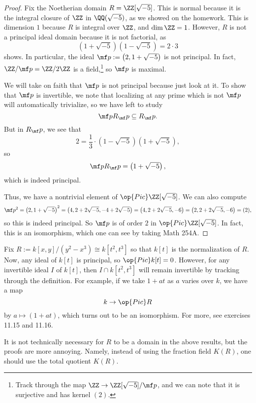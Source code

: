\begin{proof}
	Fix the Noetherian domain $R=\ZZ[\sqrt{-5}]$. This is normal because it is the integral closure of $\ZZ$ in $\QQ(\sqrt{-5})$, as we showed on the homework. This is dimension $1$ because $R$ is integral over $\ZZ$, and $\dim\ZZ=1$. However, $R$ is not a principal ideal domain because it is not factorial, as
	\[\left(1+\sqrt{-5}\right)\left(1-\sqrt{-5}\right)=2\cdot3\]
	shows. In particular, the ideal $\mf p:=\left(2,1+\sqrt{-5}\right)$ is not principal. In fact, $\ZZ/\mf p=\ZZ/2\ZZ$ is a field,\footnote{Track through the map $\ZZ\to\ZZ[\sqrt{-5}]/\mf p$, and we can note that it is surjective and has kernel $(2)$.} so $\mf p$ is maximal.

	We will take on faith that $\mf p$ is not principal because just look at it. To show that $\mf p$ is invertible, we note that localizing at any prime which is not $\mf p$ will automatically trivialize, so we have left to study
	\[\mf pR_\mf p\subseteq R_\mf p.\]
	But in $R_\mf p$, we see that
	\[2=\frac13\cdot\left(1-\sqrt{-5}\right)\left(1+\sqrt{-5}\right),\]
	so
	\[\mf pR_\mf p=\left(1+\sqrt{-5}\right),\]
	which is indeed principal.

	Thus, we have a nontrivial element of $\op{Pic}\ZZ[\sqrt{-5}]$. We can also compute
	\[\mf p^2=\left(2,1+\sqrt{-5}\right)^2=\left(4,2+2\sqrt{-5},-4+2\sqrt{-5}\right)=\left(4,2+2\sqrt{-5},-6\right)=\left(2,2+2\sqrt{-5},-6\right)=(2),\]
	so this is indeed principal. So $\mf p$ is of order $2$ in $\op{Pic}\ZZ[\sqrt{-5}]$. In fact, this is an isomorphism, which one can see by taking Math 254A.
\end{proof}
\begin{ex}
	Fix $R:=k[x,y]/\left(y^2-x^3\right)\cong k\left[t^2,t^3\right]$ so that $k[t]$ is the normalization of $R$. Now, any ideal of $k[t]$ is principal, so $\op{Pic}k[t]=0$. However, for any invertible ideal $I$ of $k[t]$, then $I\cap k\left[t^2,t^3\right]$ will remain invertible by tracking through the definition. For example, if we take $1+at$ as $a$ varies over $k$, we have a map
	\[k\to\op{Pic}R\]
	by $a\mapsto(1+at)$, which turns out to be an isomorphism. For more, see exercises 11.15 and 11.16.
\end{ex}
\begin{remark}
	It is not technically necessary for $R$ to be a domain in the above results, but the proofs are more annoying. Namely, instead of using the fraction field $K(R)$, one should use the total quotient $K(R)$.
\end{remark}


